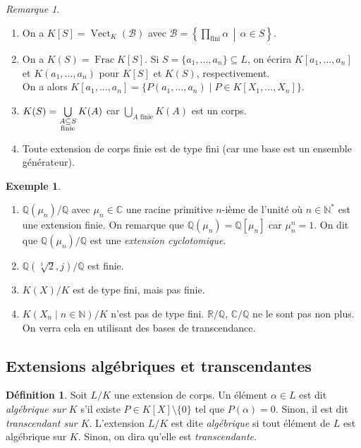 \documentclass{article}
\newcommand{\N}{\mathbb{N}}
\newcommand{\Q}{\mathbb{Q}}
\newcommand{\R}{\mathbb{R}}
\newcommand{\C}{\mathbb{C}}
\newcommand{\base}{\mathcal{B}}
\DeclareMathOperator{\Vect}{Vect}
\DeclareMathOperator{\Frac}{Frac}
\newcommand{\midbar}{\, \middle|\,}
\theoremstyle{plain}
\theoremstyle{definition}
\newtheorem{definition}[theorem]{Définition}
\newtheorem{example}[theorem]{Exemple}
\theoremstyle{remark}
\newtheorem*{remark}{Remarque}
\begin{document}
\begin{remark} \leavevmode
    \begin{enumerate}
        \item On a $K[S] = \Vect_K (\base)$ avec $\base = \left\{\prod\limits_{\text{fini}} \alpha \midbar \alpha \in S\right\}$.
        \item On a $K(S) = \Frac K[S]$. Si $S = \{a_1,\dots,a_n\} \subseteq L$, on écrira $K[a_1,\dots,a_n]$ et $K(a_1,\dots,a_n)$ pour $K[S]$ et $K(S)$, respectivement. \\
        On a alors $K[a_1,\dots,a_n] = \{P(a_1,\dots,a_n) \mid P \in K[X_1,\dots,X_n]\}$.
        \item $K(S) = \bigcup\limits_{\begin{subarray}{c} A \subseteq S \\ \text{finie}\end{subarray}} K(A)$ car $\bigcup\limits_{A \text{ finie}} K(A)$ est un corps.
        \item Toute extension de corps finie est de type fini (car une base est un ensemble générateur).
    \end{enumerate}
\end{remark}

\begin{example} \leavevmode
    \begin{enumerate}
        \item $\Q(\mu_n)/\Q$ avec $\mu_n \in \C$ une racine primitive $n$-ième de l'unité où $n \in \N^*$ est une extension finie. On remarque que $\Q(\mu_n) = \Q[\mu_n]$ car $\mu_n^n = 1$. On dit que $\Q(\mu_n)/\Q$ est une \emph{extension cyclotomique}.
        \item $\Q(\sqrt[3]{2},j)/\Q$ est finie.
        \item $K(X)/K$ est de type fini, mais pas finie.
        \item $K(X_n \mid n \in \N)/K$ n'est pas de type fini. $\R/\Q$, $\C/\Q$ ne le sont pas non plus. On verra cela en utilisant des bases de transcendance.
    \end{enumerate}
\end{example}

\subsection{Extensions algébriques et transcendantes}

\begin{definition}
    Soit $L/K$ une extension de corps. Un élément $\alpha \in L$ est dit \emph{algébrique sur $K$} s'il existe $P \in K[X] \setminus \{0\}$ tel que $P(\alpha) = 0$. Sinon, il est dit \emph{transcendant sur $K$}. L'extension $L/K$ est dite \emph{algébrique} si tout élément de $L$ est algébrique sur $K$. Sinon, on dira qu'elle est \emph{transcendante}.
\end{definition}
\end{document}
